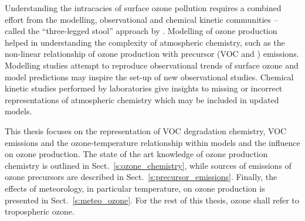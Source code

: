 Understanding the intracacies of surface ozone pollution requires a combined effort from the modelling, observational and chemical kinetic communities -- called the ``three-legged stool'' approach by \citet{Abbatt:2014}.
Modelling of ozone production helped in understanding the complexity of atmospheric chemistry, such as the non-linear relationship of ozone production with precursor (VOC and ) emissions.
Modelling studies attempt to reproduce observational trends of surface ozone and model predictions may inspire the set-up of new observational studies.
Chemical kinetic studies performed by laboratories give insights to missing or incorrect representations of atmospheric chemistry which may be included in updated models.

This thesis focuses on the representation of VOC degradation chemistry, VOC emissions and the ozone-temperature relationship within models and the influence on ozone production.
The state of the art knowledge of ozone production chemistry is outlined in Sect.~\ref{s:ozone_chemistry}, while sources of emissions of ozone precursors are described in Sect.~\ref{s:precursor_emissions}.
Finally, the effects of meteorology, in particular temperature, on ozone production is presented in Sect.~\ref{s:meteo_ozone}.
For the rest of this thesis, ozone shall refer to tropospheric ozone.


%

